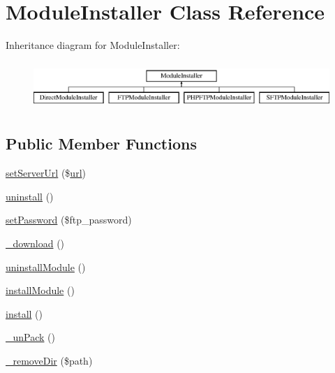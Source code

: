 \hypertarget{classModuleInstaller}{}\section{Module\+Installer Class Reference}
\label{classModuleInstaller}
Inheritance diagram for Module\+Installer\+:\begin{figure}[H]
\begin{center}
\leavevmode
\includegraphics[height=1.818182cm]{classModuleInstaller}
\end{center}
\end{figure}
\subsection*{Public Member Functions}
\begin{DoxyCompactItemize}
\item 
\hyperlink{classModuleInstaller_a4b4f25bccb1203ee61ff75dd1a0e0964}{set\+Server\+Url} (\$\hyperlink{swfupload_8js_a440a52a9004fdab0700100a6ddb49f67}{url})
\item 
\hyperlink{classModuleInstaller_a641ebe46305e7c320eec21a13d7e029f}{uninstall} ()
\item 
\hyperlink{classModuleInstaller_ad0cad9e399cc3a7de3f742d43364e96a}{set\+Password} (\$ftp\+\_\+password)
\item 
\hyperlink{classModuleInstaller_aeaa5ff80b85cbf6718f19e755fcbc016}{\+\_\+download} ()
\item 
\hyperlink{classModuleInstaller_a9ab463e12e9685dc42d4223b86a92754}{uninstall\+Module} ()
\item 
\hyperlink{classModuleInstaller_a07eb4b03dfd704124e05142cef5c9e82}{install\+Module} ()
\item 
\hyperlink{classModuleInstaller_aada761e2e31fc610bb69680991813bf8}{install} ()
\item 
\hyperlink{classModuleInstaller_a4b669f44350c27a508c2aac3180836f6}{\+\_\+un\+Pack} ()
\item 
\hyperlink{classModuleInstaller_a1d67a0ab016c393b15df54dabff74e9b}{\+\_\+remove\+Dir} (\$path)
\end{DoxyCompactItemize}

